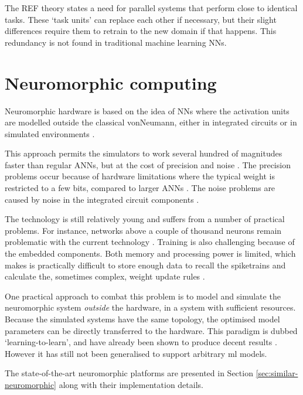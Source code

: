 \documentclass[report.tex]{subfiles}
\begin{document}
The \gls{REF} theory states a need for parallel systems that perform close to
identical tasks.
These `task units' can replace each other if necessary, but their slight 
differences require them to retrain to the new domain if that happens.
This redundancy is not found in traditional machine learning \glspl{NN}.

\section{Neuromorphic computing}
Neuromorphic hardware is based on the idea of \glspl{NN} where the activation
units are modelled outside the classical \gls{vonNeumann}, either in 
integrated circuits or in simulated environments \cite{Albada2018,Blundell2018,Schmitt2017}.

This approach permits the simulators to work several hundred of magnitudes
faster than regular \gls{ANN}s, but at the cost of precision and noise
\cite{Indiveri2015, Schmitt2017}.
The precision problems occur because of hardware limitations where the typical
weight is restricted to a few bits, compared to larger \glspl{ANN}
\cite{Indiveri2015, Lin2018}.
The noise problems are caused by noise in the integrated circuit components 
\cite{Lin2018, Pfeil2013}.

The technology is still relatively young and suffers from a number
of practical problems. 
For instance, networks above a couple of thousand neurons remain
problematic with the current technology \cite{Schmitt2017}.
Training is also challenging because of the embedded components.
Both memory and processing power is limited, which makes is practically
difficult to store enough data to recall the spiketrains and calculate the,
sometimes complex, weight update rules \cite{Albada2018}.

One practical approach to combat this problem is to model and simulate the neuromorphic
system \textit{outside} the hardware, in a system with sufficient resources.
Because the simulated systems have the same topology, the optimised model
parameters can be directly transferred to the hardware. 
This paradigm is dubbed `learning-to-learn', and
have already been shown to produce decent results \cite{Schmitt2017,
Albada2018}.
However it has still not been generalised to support arbitrary \gls{ml} models.

The state-of-the-art neuromorphic platforms are presented in Section
\ref{sec:similar-neuromorphic} along with their implementation details.
\end{document}
